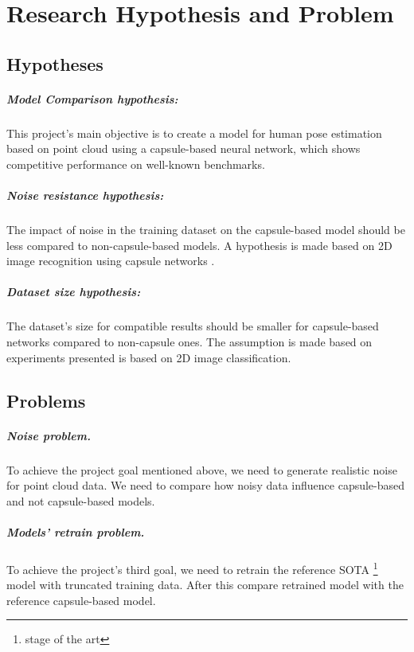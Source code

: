 \chapter{Research Hypothesis and Problem}
\label{Hypothesis}

\section{Hypotheses}
\paragraph{Model Comparison hypothesis:} This project's main objective is to create a model for human pose estimation based on point cloud using a capsule-based neural network, which shows competitive performance on well-known benchmarks.

\paragraph{Noise resistance hypothesis:} The impact of noise in the training dataset on the capsule-based model should be less compared to non-capsule-based models. A hypothesis is made based on 2D image recognition using capsule networks \cite{sabour_dynamic_2017,}.

\paragraph{Dataset size hypothesis:} The dataset's size for compatible results should be smaller for capsule-based networks compared to non-capsule ones. The assumption is made based on experiments presented is \cite{sabour_dynamic_2017,wang_capsule_2020,gritsevskiy_capsule_2018} based on 2D image classification.

\section{Problems}
\paragraph{Noise problem.} To achieve the project goal mentioned above, we need to generate realistic noise for point cloud data. We need to compare how noisy data influence capsule-based and not capsule-based models. 

\paragraph{Models' retrain problem.} To achieve the project's third goal, we need to retrain the reference SOTA \footnote{stage of the art} model with truncated training data. After this compare retrained model with the reference capsule-based model.